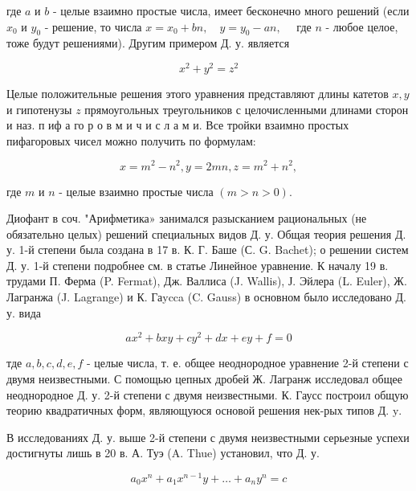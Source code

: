 \documentclass[10pt]{article}
\begin{document}
где $a$ и $b$ - целые взаимно простые числа, имеет бесконечно много решений (если $x_{0}$ и $y_{0}$ - решение, то числа $x=x_{0}+b n, \quad y=y_{0}-a n, \quad$ где $n$ - любое целое, тоже будут решениями). Другим примером Д. у. является



\[

x^{2}+y^{2}=z^{2}

\]



Целые положительные решения этого уравнения представляют длины катетов $x, y$ и гипотенузы $z$ прямоугольных треугольников с целочисленными длинами сторон и наз. п иф а го р о в м и ч и с л а м и. Все тройки взаимно простых пифагоровых чисел можно получить по формулам:



\[

x=m^{2}-n^{2}, y=2 m n, z=m^{2}+n^{2},

\]



где $m$ и $n$ - целые взаимно простые числа $(m>n>0)$.



Диофант в соч. "Арифметика» занимался разысканием рациональных (не обязательно целых) решений специальных видов Д. у. Общая теория решения Д. у. 1-й степени была создана в 17 в. К. Г. Баше (С. G. Bachet); о решении систем Д. у. 1-й степени подробнее см. в статье Линейное уравнение. К началу 19 в. трудами П. Ферма (P. Fermat), Дж. Валлиса (J. Wallis), Ј. Эйлера (L. Euler), Ж. Лагранжа (J. Lagrange) и К. Гаycca (C. Gauss) в основном было исследовано Д. у. вида



\[

a x^{2}+b x y+c y^{2}+d x+e y+f=0

\]



тде $a, b, c, d, e, f$ - целые числа, т. е. общее неоднородное уравнение 2-й степени с двумя неизвестными. С помощью цепных дробей Ж. Лагранж исследовал общее неоднородное Д. у. 2-й степени с двумя неизвестными. К. Гаусс построил общую теорию квадратичных форм, являющуюся основой решения нек-рых типов Д. $\mathrm{y}$.



В исследованиях Д. у. выше 2-й степени с двумя неизвестными серьезные успехи достигнуты лишь в 20 в. А. Туэ (A. Thue) установил, что Д. у.



\[

a_{0} x^{n}+a_{1} x^{n-1} y+\ldots+a_{n} y^{n}=c

\]
\end{document}
